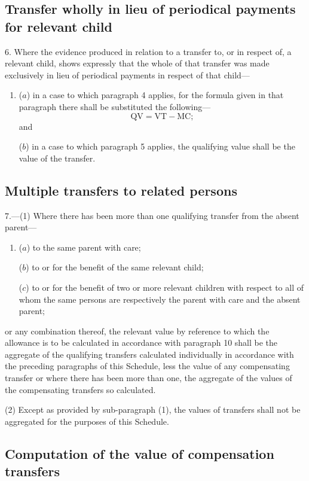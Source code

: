 \documentclass[12pt,a4paper]{article}
\begin{document}
\subsection*{\sloppy Transfer wholly in lieu of periodical payments for relevant child}

6.  Where the evidence produced in relation to a transfer to, or in respect of, a relevant child, shows expressly that the whole of that transfer was made exclusively in lieu of periodical payments in respect of that child—
\begin{enumerate}\item[]
($a$) in a case to which paragraph 4 applies, for the formula given in that paragraph there shall be substituted the following—
\[\mathrm{QV} = \mathrm{VT} - \mathrm{MC};\]
and

($b$) in a case to which paragraph 5 applies, the qualifying value shall be the value of the transfer.
\end{enumerate}

\subsection*{Multiple transfers to related persons}

7.—(1) Where there has been more than one qualifying transfer from the absent parent—
\begin{enumerate}\item[]
($a$) to the same parent with care;

($b$) to or for the benefit of the same relevant child;

($c$) to or for the benefit of two or more relevant children with respect to all of whom the same persons are respectively the parent with care and the absent parent;
\end{enumerate}
or any combination thereof, the relevant value by reference to which the allowance is to be calculated in accordance with paragraph 10 shall be the aggregate of the qualifying transfers calculated individually in accordance with the preceding paragraphs of this Schedule, less the value of any compensating transfer or where there has been more than one, the aggregate of the values of the compensating transfers so calculated.

(2) Except as provided by sub-paragraph (1), the values of transfers shall not be aggregated for the purposes of this Schedule.

\subsection*{Computation of the value of compensation transfers}
\end{document}
